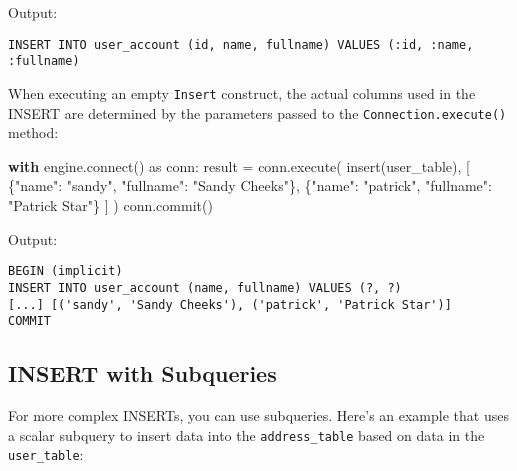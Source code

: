 \documentclass[
  letterpaper,
  DIV=11,
  numbers=noendperiod]{scrreprt}
\newenvironment{Shaded}{\begin{snugshade}}{\end{snugshade}}
\newcommand{\ControlFlowTok}[1]{\textcolor[rgb]{0.00,0.23,0.31}{\textbf{#1}}}
\newcommand{\ExtensionTok}[1]{\textcolor[rgb]{0.00,0.23,0.31}{#1}}
\newcommand{\ImportTok}[1]{\textcolor[rgb]{0.00,0.46,0.62}{#1}}
\newcommand{\NormalTok}[1]{\textcolor[rgb]{0.00,0.23,0.31}{#1}}
\newcommand{\OperatorTok}[1]{\textcolor[rgb]{0.37,0.37,0.37}{#1}}
\newcommand{\StringTok}[1]{\textcolor[rgb]{0.13,0.47,0.30}{#1}}
\begin{document}
Output:

\begin{verbatim}
INSERT INTO user_account (id, name, fullname) VALUES (:id, :name, :fullname)
\end{verbatim}

When executing an empty \texttt{Insert} construct, the actual columns
used in the INSERT are determined by the parameters passed to the
\texttt{Connection.execute()} method:

\begin{Shaded}
\begin{Highlighting}[]
\ControlFlowTok{with}\NormalTok{ engine.}\ExtensionTok{connect}\NormalTok{() }\ImportTok{as}\NormalTok{ conn:}
\NormalTok{    result }\OperatorTok{=}\NormalTok{ conn.execute(}
\NormalTok{        insert(user\_table),}
\NormalTok{        [}
\NormalTok{            \{}\StringTok{"name"}\NormalTok{: }\StringTok{"sandy"}\NormalTok{, }\StringTok{"fullname"}\NormalTok{: }\StringTok{"Sandy Cheeks"}\NormalTok{\},}
\NormalTok{            \{}\StringTok{"name"}\NormalTok{: }\StringTok{"patrick"}\NormalTok{, }\StringTok{"fullname"}\NormalTok{: }\StringTok{"Patrick Star"}\NormalTok{\}}
\NormalTok{        ]}
\NormalTok{    )}
\NormalTok{    conn.commit()}
\end{Highlighting}
\end{Shaded}

Output:

\begin{verbatim}
BEGIN (implicit)
INSERT INTO user_account (name, fullname) VALUES (?, ?)
[...] [('sandy', 'Sandy Cheeks'), ('patrick', 'Patrick Star')]
COMMIT
\end{verbatim}

\subsection{INSERT with Subqueries}\label{insert-with-subqueries}

For more complex INSERTs, you can use subqueries. Here's an example that
uses a scalar subquery to insert data into the \texttt{address\_table}
based on data in the \texttt{user\_table}:
\end{document}
